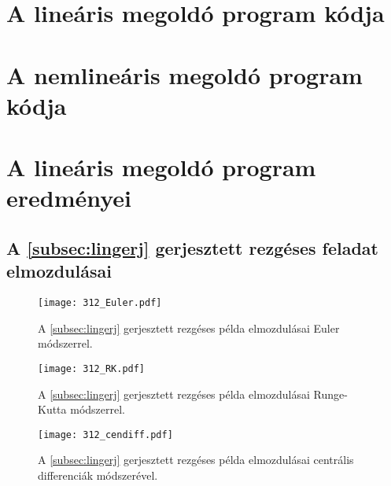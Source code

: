\appendix


\chapter{A lineáris megoldó program kódja}\label{chap: függ linprog}


 
 
 
 
 
 

\chapter{A nemlineáris megoldó program kódja}\label{chap: függ nemlinprog}


 
 
 
 
 
 

\chapter{A lineáris megoldó program eredményei}\label{chap: függ eredmények}

\section{A \ref{subsec:lingerj} gerjesztett rezgéses  feladat elmozdulásai}\label{sec:függ_lingerj}

\begin{figure}[H]
\centering
\texttt{[image: 312\_Euler.pdf]}
\caption{A \ref{subsec:lingerj} gerjesztett rezgéses példa elmozdulásai Euler módszerrel.}
\label{fig:lingerjeredm_euler}
\end{figure}
\begin{figure}[H]
\centering
\texttt{[image: 312\_RK.pdf]}
\caption{A \ref{subsec:lingerj} gerjesztett rezgéses példa elmozdulásai Runge-Kutta módszerrel.}
\label{fig:lingerjeredm_rk}
\end{figure}
\begin{figure}[H]
\centering
\texttt{[image: 312\_cendiff.pdf]}
\caption{A \ref{subsec:lingerj} gerjesztett rezgéses példa elmozdulásai centrális differenciák módszerével.}
\label{fig:lingerjeredm_centdiff}
\end{figure}

